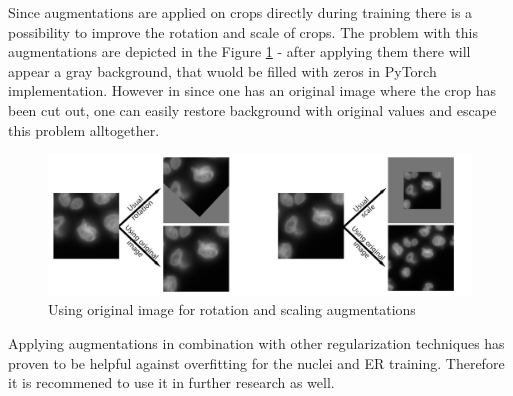 Since augmentations are applied on crops directly during training there is a possibility to improve the rotation and scale of crops. The problem with this augmentations are depicted in the Figure \ref{fig:smart-augments} - after applying them there will appear a gray background, that wuold be filled with zeros in PyTorch implementation. However in since one has an original image where the crop has been cut out, one can easily restore background with original values and escape this problem alltogether.

\begin{figure}[H]
	\begin{center}
		\includegraphics[width=0.7\linewidth]{bilder/model training/smart augmentations.png}
		\caption{Using original image for rotation and scaling augmentations}\label{fig:smart-augments}
	\end{center}
\end{figure}

Applying augmentations in combination with other regularization techniques has proven to be helpful against overfitting for the nuclei and ER training. Therefore it is recommened to use it in further research as well.